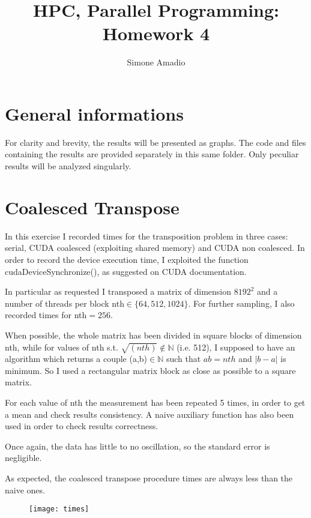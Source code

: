 \documentclass[10pt,a4paper]{article}
\begin{document}
\author{Simone Amadio}
\title{HPC, Parallel Programming:\\Homework 4}
\date{}
\maketitle

\section*{General informations}

For clarity and brevity, the results will be presented as graphs. The code and files containing the results are provided separately in this same folder. Only peculiar results will be analyzed singularly.

\section{Coalesced Transpose}
In this exercise I recorded times for the transposition problem in three cases: serial, CUDA coalesced (exploiting shared memory) and CUDA non coalesced. In order to record the device execution time, I exploited the function cudaDeviceSynchronize(), as suggested on CUDA documentation.

In particular as requested I transposed a matrix of dimension $8192^2$ and a number of threads per block nth$\in \{64,512,1024\}$. For further sampling, I also recorded times for nth$=256$.

When possible, the whole matrix has been divided in square blocks of dimension nth, while for values of nth s.t. $\sqrt{(nth)}\notin \mathbb{N}$ (i.e. 512), I supposed to have an algorithm which returns a couple (a,b)$\in\mathbb{N}$ such that $ab=nth$ and $|b-a|$ is minimum. So I used a rectangular matrix block as close as possible to a square matrix.

For each value of nth the measurement has been repeated 5 times, in order to get a mean and check results consistency. A naive auxiliary function has also been used in order to check results correctness.

Once again, the data has little to no oscillation, so the standard error is negligible.

As expected, the coalesced transpose procedure times are always less than the naive ones. 
\newpage
\begin{figure}[h]
	\centering
	\texttt{[image: times]}
	\caption*{}
	\label{fig:times}
\end{figure}
\end{document}
